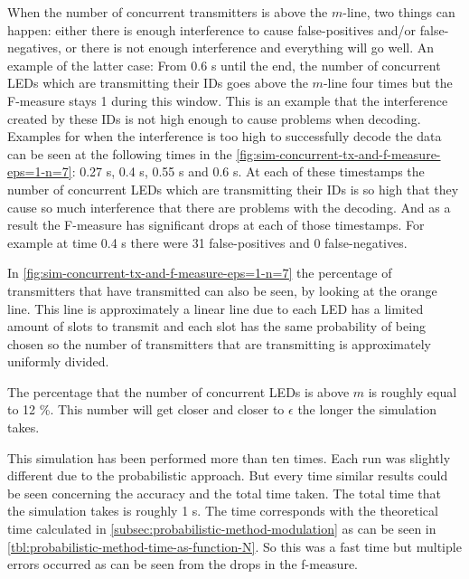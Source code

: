 When the number of concurrent transmitters is above the $m$-line, two things can happen: either there is enough interference to cause false-positives and/or false-negatives, or there is not enough interference and everything will go well.
An example of the latter case: From 0.6 s until the end, the number of concurrent LEDs which are transmitting their IDs goes above the $m$-line four times but the F-measure stays 1 during this window.
This is an example that the interference created by these IDs is not high enough to cause problems when decoding.
Examples for when the interference is too high to successfully decode the data can be seen at the following times in the \autoref{fig:sim-concurrent-tx-and-f-measure-eps=1-n=7}: 0.27 s, 0.4 s, 0.55 s and 0.6 s.
At each of these timestamps the number of concurrent LEDs which are transmitting their IDs is so high that they cause so much interference that there are problems with the decoding.
And as a result the F-measure has significant drops at each of those timestamps.
For example at time 0.4 s there were 31 false-positives and 0 false-negatives.



In \autoref{fig:sim-concurrent-tx-and-f-measure-eps=1-n=7} the percentage of transmitters that have transmitted can also be seen, by looking at the orange line.
This line is approximately a linear line due to each LED has a limited amount of slots to transmit and each slot has the same probability of being chosen so the number of transmitters that are transmitting is approximately uniformly divided.


The percentage that the number of concurrent LEDs is above $m$ is roughly equal to 12 \%.
This number will get closer and closer to $\epsilon$ the longer the simulation takes.


This simulation has been performed more than ten times.
Each run was slightly different due to the probabilistic approach.
But every time similar results could be seen concerning the accuracy and the total time taken.
The total time that the simulation takes is roughly 1 s.
The time corresponds with the theoretical time calculated in \autoref{subsec:probabilistic-method-modulation} as can be seen in \autoref{tbl:probabilistic-method-time-as-function-N}.
So this was a fast time but multiple errors occurred as can be seen from the drops in the f-measure.



